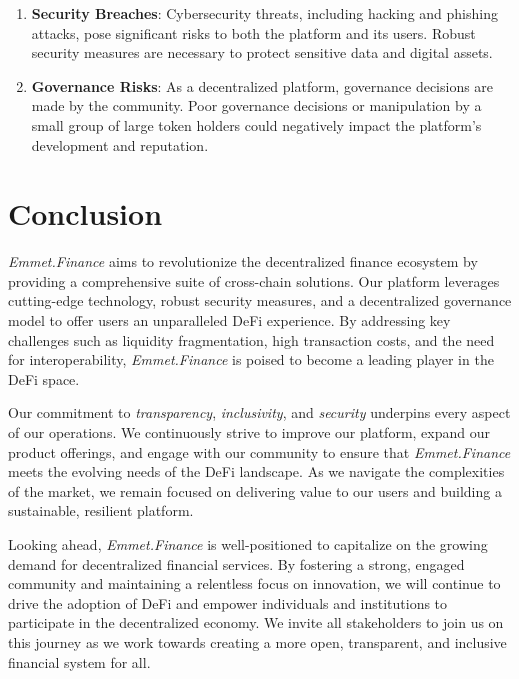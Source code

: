 \documentclass[12pt, a4paper]{article}
\begin{document}
\begin{enumerate}
    \item \textbf{Security Breaches}: Cybersecurity threats, including hacking and phishing attacks, pose significant risks to both the platform and its users. Robust security measures are necessary to protect sensitive data and digital assets.
    \item \textbf{Governance Risks}: As a decentralized platform, governance decisions are made by the community. Poor governance decisions or manipulation by a small group of large token holders could negatively impact the platform's development and reputation.
\end{enumerate}

\section{Conclusion}

\textit{Emmet.Finance} aims to revolutionize the decentralized finance ecosystem by providing a comprehensive suite of cross-chain solutions. Our platform leverages cutting-edge technology, robust security measures, and a decentralized governance model to offer users an unparalleled DeFi experience. By addressing key challenges such as liquidity fragmentation, high transaction costs, and the need for interoperability, \textit{Emmet.Finance} is poised to become a leading player in the DeFi space.

Our commitment to \textit{transparency}, \textit{inclusivity}, and \textit{security} underpins every aspect of our operations. We continuously strive to improve our platform, expand our product offerings, and engage with our community to ensure that \textit{Emmet.Finance} meets the evolving needs of the DeFi landscape. As we navigate the complexities of the market, we remain focused on delivering value to our users and building a sustainable, resilient platform.

Looking ahead, \textit{Emmet.Finance} is well-positioned to capitalize on the growing demand for decentralized financial services. By fostering a strong, engaged community and maintaining a relentless focus on innovation, we will continue to drive the adoption of DeFi and empower individuals and institutions to participate in the decentralized economy. We invite all stakeholders to join us on this journey as we work towards creating a more open, transparent, and inclusive financial system for all.
\end{document}
